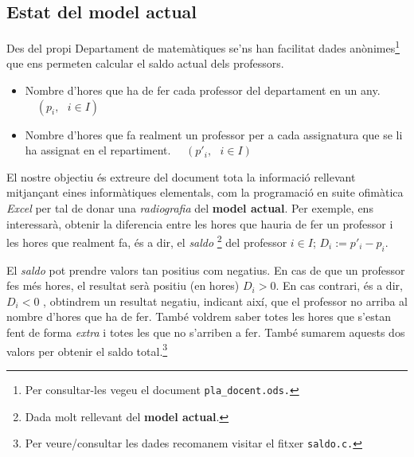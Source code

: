 \documentclass[10pt,twocolumn]{article}
\newcommand{\esp}{\text{ }}
\newcommand{\cod}[1]{{ \color{redviolet}\texttt{#1}}}
\begin{document}
\subsection{Estat del model actual}
Des del propi Departament de matemàtiques se'ns han facilitat dades anònimes\footnote{Per consultar-les vegeu el document \cod{pla\_docent.ods.}} que ens permeten calcular el saldo actual dels professors. 
\begin{itemize}
	\item Nombre d'hores que ha de fer cada professor del departament en un any.$\quad(p_i, \esp i \in I)$
	\item Nombre d'hores que fa realment un professor per a cada assignatura que se li ha assignat en el repartiment. $\quad (p'_i, \esp i \in I)$
\end{itemize}
El nostre objectiu és extreure del document tota la informació rellevant  mitjançant eines informàtiques elementals, com la programació en suite ofimàtica \textit{Excel}  per tal de donar una \textit{radiografia} del \textbf{model actual}. Per exemple, ens interessarà, obtenir la diferencia entre les hores que hauria de fer un professor i les hores que realment fa, és a dir, el \textit{saldo} \footnote{Dada molt rellevant del \textbf{model actual}.} del professor $i\in I$; $D_i:=p'_i-p_i$.

El \textit{saldo} pot prendre valors tan positius com negatius. En cas de que un professor fes més hores, el resultat  serà positiu (en hores) $D_i>0$. En cas contrari, és a dir, $D_i<0$ , obtindrem un resultat negatiu, indicant així, que el professor no arriba al nombre d'hores que ha de fer. També voldrem saber totes les hores que s'estan fent de forma \textit{extra} i totes les que no s'arriben a fer.  També sumarem aquests dos valors per obtenir el saldo total.\footnote{Per veure/consultar les dades recomanem visitar el fitxer \cod{saldo.c.}}
\end{document}
